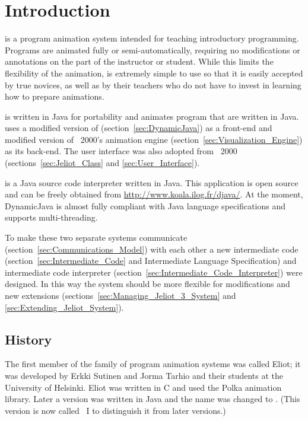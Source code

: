 \section{Introduction}
\label{sec:Introduction}

\jel{} is a program animation system intended for teaching introductory
programming. Programs are animated fully or semi-automatically, requiring
no modifications or annotations on the part of the instructor or student.
While this limits the flexibility of the animation, \jel{} is extremely
simple to use so that it is easily accepted by true novices, as well as
by their teachers who do not have to invest in learning how to prepare
animations.

\jel{} is written in Java for portability and animates program that are
written in Java. \jel{} uses a modified version of \djava{} \citep{DJava}
(section~\ref{sec:DynamicJava}) as a front-end and
modified version of \jel{}~2000's animation engine
(section~\ref{sec:Visualization_Engine}) as its back-end. The user interface
was also adopted from \jel{}~2000 (sections~\ref{sec:Jeliot_Class} and
\ref{sec:User_Interface}).

\djava{} is a Java source code interpreter written in Java. This
application is open source and can be freely obtained from
\url{http://www.koala.ilog.fr/djava/}. At the moment, DynamicJava is
almost fully compliant with Java language specifications and supports
multi-threading.

To make these two separate systems communicate
(section~\ref{sec:Communications_Model}) with each other a new
intermediate code (section~\ref{sec:Intermediate_Code} and
Intermediate Language Specification) and intermediate code
interpreter (section~\ref{sec:Intermediate_Code_Interpreter}) were
designed. In this way the system should be more flexible for
modifications and new extensions
(sections~\ref{sec:Managing_Jeliot_3_System} and
\ref{sec:Extending_Jeliot_System}).

\subsection{History}

The first member of the \jel{} family of program animation systems was
called Eliot; it was developed by Erkki Sutinen and Jorma Tarhio and
their students at the University of Helsinki. Eliot was written in C
and used the Polka animation library. Later a version was written in
Java and the name was changed to \jel{}. (This version is now called
\jel{}~I to distinguish it from later versions.)

